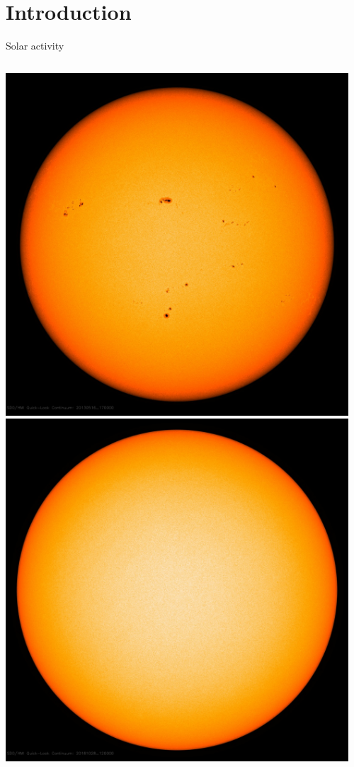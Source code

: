 \section{Introduction}

\begin{frame}[plain,c]{Solar activity}{}
	\begin{columns}[c]
		
		\includegraphics[width=0.96\textwidth]{../talk_figures/20130516_170000_1024_HMIIC.jpg}
		\includegraphics[width=0.96\textwidth]{../talk_figures/20181028_120000_1024_HMIIC.jpg}
		

\end{columns}
\end{frame}
